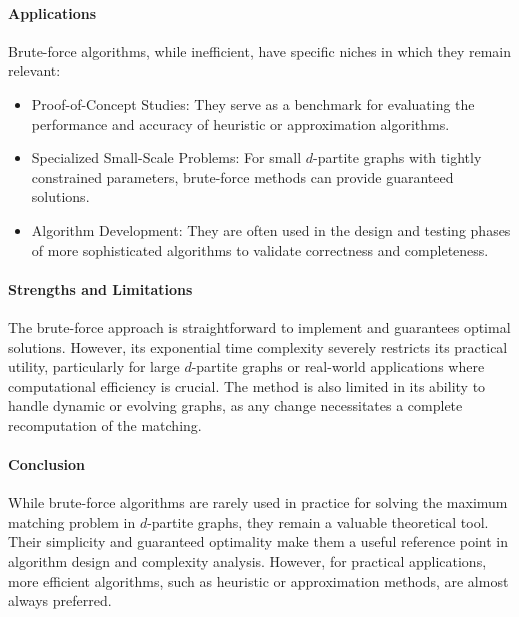 \paragraph{Applications}
Brute-force algorithms, while inefficient, have specific niches in which they remain relevant:
\begin{itemize}
    \item Proof-of-Concept Studies:
    They serve as a benchmark for evaluating the performance and accuracy of heuristic or approximation algorithms.
    \item Specialized Small-Scale Problems:
    For small \(d\)-partite graphs with tightly constrained parameters, brute-force methods can provide guaranteed solutions.
    \item Algorithm Development:
    They are often used in the design and testing phases of more sophisticated algorithms to validate correctness and completeness.
\end{itemize}

\paragraph{Strengths and Limitations}
The brute-force approach is straightforward to implement and guarantees optimal solutions. However, its exponential time complexity severely restricts its practical utility, particularly for large \(d\)-partite graphs or real-world applications where computational efficiency is crucial. The method is also limited in its ability to handle dynamic or evolving graphs, as any change necessitates a complete recomputation of the matching.

\paragraph{Conclusion}
While brute-force algorithms are rarely used in practice for solving the maximum matching problem in \(d\)-partite graphs, they remain a valuable theoretical tool. Their simplicity and guaranteed optimality make them a useful reference point in algorithm design and complexity analysis. However, for practical applications, more efficient algorithms, such as heuristic or approximation methods, are almost always preferred.
